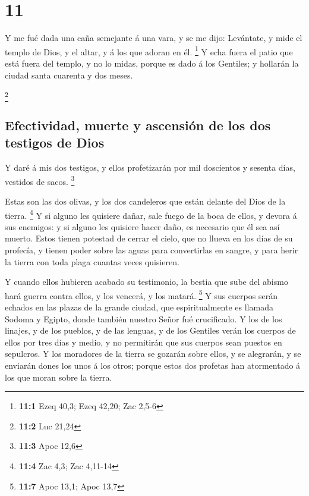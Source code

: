 \hypertarget{section-10}{%
\section{11}\label{section-10}}

 Y me fué dada una caña semejante á una vara, y se me dijo:
Levántate, y mide el templo de Dios, y el altar, y á los que adoran en
él. \footnote{\textbf{11:1} Ezeq 40,3; Ezeq 42,20; Zac 2,5-6}
 Y echa fuera el patio que está fuera del templo, y no lo
midas, porque es dado á los Gentiles; y hollarán la ciudad santa
cuarenta y dos meses.

\footnote{\textbf{11:2} Luc 21,24}

\hypertarget{efectividad-muerte-y-ascensiuxf3n-de-los-dos-testigos-de-dios}{%
\subsection{Efectividad, muerte y ascensión de los dos testigos de
Dios}\label{efectividad-muerte-y-ascensiuxf3n-de-los-dos-testigos-de-dios}}

 Y daré á mis dos testigos, y ellos profetizarán por mil
doscientos y sesenta días, vestidos de sacos. \footnote{\textbf{11:3}
  Apoc 12,6}

 Estas son las dos olivas, y los dos candeleros que están
delante del Dios de la tierra. \footnote{\textbf{11:4} Zac 4,3; Zac
  4,11-14}  Y si alguno les quisiere dañar, sale fuego de la
boca de ellos, y devora á sus enemigos: y si alguno les quisiere hacer
daño, es necesario que él sea así muerto.  Estos tienen
potestad de cerrar el cielo, que no llueva en los días de su profecía, y
tienen poder sobre las aguas para convertirlas en sangre, y para herir
la tierra con toda plaga cuantas veces quisieren.

 Y cuando ellos hubieren acabado su testimonio, la bestia
que sube del abismo hará guerra contra ellos, y los vencerá, y los
matará. \footnote{\textbf{11:7} Apoc 13,1; Apoc 13,7}  Y sus
cuerpos serán echados en las plazas de la grande ciudad, que
espiritualmente es llamada Sodoma y Egipto, donde también nuestro Señor
fué crucificado.  Y los de los linajes, y de los pueblos, y
de las lenguas, y de los Gentiles verán los cuerpos de ellos por tres
días y medio, y no permitirán que sus cuerpos sean puestos en sepulcros.
 Y los moradores de la tierra se gozarán sobre ellos, y se
alegrarán, y se enviarán dones los unos á los otros; porque estos dos
profetas han atormentado á los que moran sobre la tierra.

